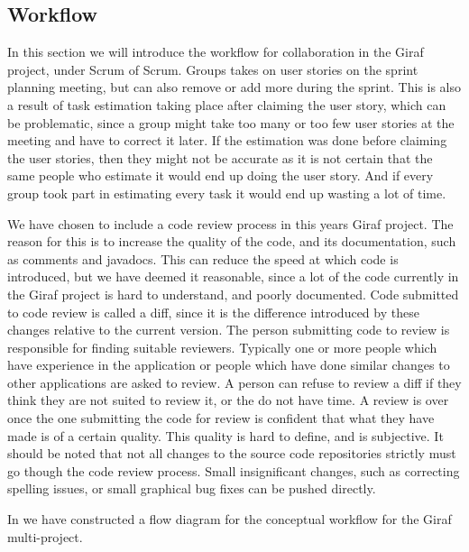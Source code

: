 \subsection*{Workflow}
In this section we will introduce the workflow for collaboration in the Giraf project, under Scrum of Scrum. 
Groups takes on user stories on the sprint planning meeting, but can also remove or add more during the sprint.
This is also a result of task estimation taking place after claiming the user story, which can be problematic, since a group might take too many or too few user stories at the meeting and have to correct it later. 
If the estimation was done before claiming the user stories, then they might not be accurate as it is not certain that the same people who estimate it would end up doing the user story.
And if every group took part in estimating every task it would end up wasting a lot of time. 

We have chosen to include a code review process in this years Giraf project. 
The reason for this is to increase the quality of the code, and its documentation, such as comments and javadocs. 
This can reduce the speed at which code is introduced, but we have deemed it reasonable, since a lot of the code currently in the Giraf project is hard to understand, and poorly documented. 
Code submitted to code review is called a diff, since it is the difference introduced by these changes relative to the current version. 
The person submitting code to review is responsible for finding suitable reviewers.
Typically one or more people which have experience in the application or people which have done similar changes to other applications are asked to review.
A person can refuse to review a diff if they think they are not suited to review it, or the do not have time. 
A review is over once the one submitting the code for review is confident that what they have made is of a certain quality.
This quality is hard to define, and is subjective. 
It should be noted that not all changes to the source code repositories strictly must go though the code review process.
Small insignificant changes, such as correcting spelling issues, or small graphical bug fixes can be pushed directly. 

In  we have constructed a flow diagram for the conceptual workflow for the Giraf multi-project. 

